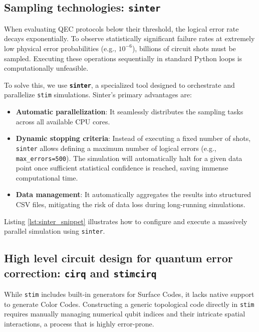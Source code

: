 \subsection{Sampling technologies: \texttt{sinter}}

When evaluating QEC protocols below their threshold, the logical error rate decays exponentially. To observe statistically significant failure rates at extremely low physical error probabilities (e.g., $10^{-6}$), billions of circuit shots must be sampled. Executing these operations sequentially in standard Python loops is computationally unfeasible.

To solve this, we use \textbf{\texttt{sinter}}, a specialized tool designed to orchestrate and parallelize \texttt{stim} simulations. Sinter's primary advantages are:
\begin{itemize}
    \item \textbf{Automatic parallelization}: It seamlessly distributes the sampling tasks across all available CPU cores.
    \item \textbf{Dynamic stopping criteria}: Instead of executing a fixed number of shots, \texttt{sinter} allows defining a maximum number of logical errors (e.g., \texttt{max\_errors=500}). The simulation will automatically halt for a given data point once sufficient statistical confidence is reached, saving immense computational time.
    \item \textbf{Data management}: It automatically aggregates the results into structured CSV files, mitigating the risk of data loss during long-running simulations.
\end{itemize}

Listing \ref{lst:sinter_snippet} illustrates how to configure and execute a massively parallel simulation using \texttt{sinter}. 



\subsection{High level circuit design for quantum error correction: \texttt{cirq} and \texttt{stimcirq}}

While \texttt{stim} includes built-in generators for Surface Codes, it lacks native support to generate Color Codes. Constructing a generic topological code directly in \texttt{stim} requires manually managing numerical qubit indices and their intricate spatial interactions, a process that is highly error-prone.

